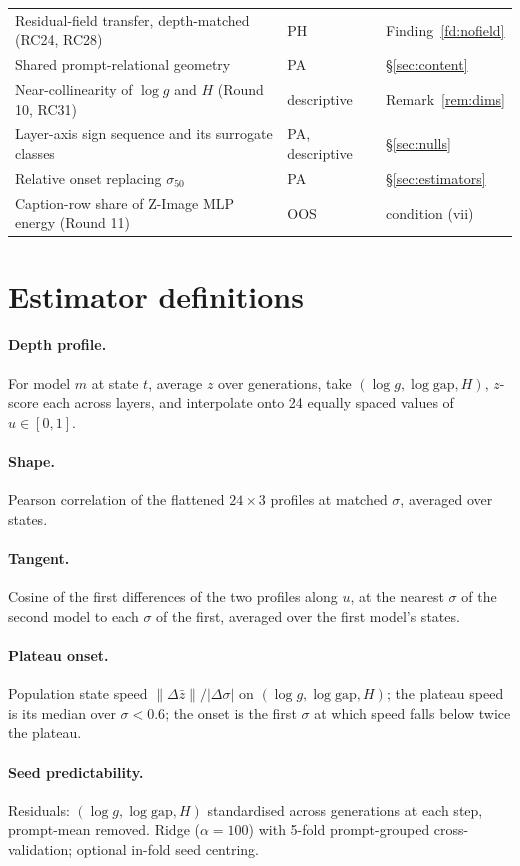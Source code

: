 \documentclass[11pt]{article}
\theoremstyle{definition}
\newcommand{\gap}{\mathrm{gap}}
\begin{document}
\begin{table}[htbp]
\begin{tabularx}{\linewidth}{@{}>{\raggedright\arraybackslash}p{4.4cm}>{\raggedright\arraybackslash}p{1.9cm}L@{}}
Residual-field transfer, depth-matched (RC24, RC28) & PH & Finding~\ref{fd:nofield}\\
Shared prompt-relational geometry & PA & \S\ref{sec:content}\\
Near-collinearity of $\log g$ and $H$ (Round 10, RC31) & descriptive & Remark~\ref{rem:dims}\\
Layer-axis sign sequence and its surrogate classes & PA, descriptive & \S\ref{sec:nulls}\\
Relative onset replacing $\sigma_{50}$ & PA & \S\ref{sec:estimators}\\
Caption-row share of Z-Image MLP energy (Round 11) & OOS & condition (vii)\\
\bottomrule
\end{tabularx}
\end{table}

\section{Estimator definitions}\label{app:estimators}
\paragraph{Depth profile.} For model $m$ at state $t$, average $z$ over generations, take $(\log g,\log\gap,H)$, $z$-score each across layers, and interpolate onto 24 equally spaced values of $u\in[0,1]$.
\paragraph{Shape.} Pearson correlation of the flattened $24\times3$ profiles at matched $\sigma$, averaged over states.
\paragraph{Tangent.} Cosine of the first differences of the two profiles along $u$, at the nearest $\sigma$ of the second model to each $\sigma$ of the first, averaged over the first model's states.
\paragraph{Plateau onset.} Population state speed $\|\Delta\bar z\|/|\Delta\sigma|$ on $(\log g,\log\gap,H)$; the plateau speed is its median over $\sigma<0.6$; the onset is the first $\sigma$ at which speed falls below twice the plateau.
\paragraph{Seed predictability.} Residuals: $(\log g,\log\gap,H)$ standardised across generations at each step, prompt-mean removed. Ridge ($\alpha=100$) with 5-fold prompt-grouped cross-validation; optional in-fold seed centring.
\end{document}
